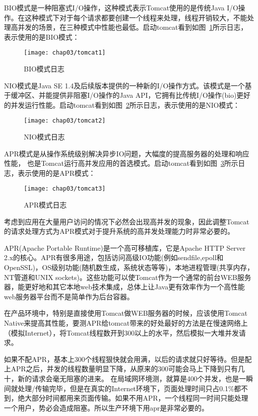 BIO模式是一种阻塞式I/O操作，这种模式表示Tomcat使用的是传统Java I/O操作。在这种模式下对于每个请求都要创建一个线程来处理，线程开销较大，不能处理高并发的场景，在三种模式中性能也最低。启动tomcat看到如图~\ref{fig:tomcat1}所示日志，表示使用的是BIO模式：
\begin{figure}[H] %
  \centering
  \texttt{[image: chap03/tomcat1]}
  \caption{BIO模式日志}
  \label{fig:tomcat1}
\end{figure}
NIO模式是Java SE 1.4及后续版本提供的一种新的I/O操作方式。该模式是一个基于缓冲区、并能提供非阻塞I/O操作的Java API，它拥有比传统I/O操作(bio)更好的并发运行性能。启动tomcat看到如图~\ref{fig:tomcat2}所示日志，表示使用的是NIO模式：
\begin{figure}[H] %
  \centering
  \texttt{[image: chap03/tomcat2]}
  \caption{NIO模式日志}
  \label{fig:tomcat2}
\end{figure}
APR模式是从操作系统级别解决异步IO问题，大幅度的提高服务器的处理和响应性能， 也是Tomcat运行高并发应用的首选模式。启动tomcat看到如图~\ref{fig:tomcat3}所示日志，表示使用的是APR模式：
\begin{figure}[H] %
  \centering
  \texttt{[image: chap03/tomcat3]}
  \caption{APR模式日志}
  \label{fig:tomcat3}
\end{figure}
考虑到应用在大量用户访问的情况下必然会出现高并发的现象，因此调整Tomcat的请求处理方式为APR模式对于提升系统的高并发处理能力时非常必要的\cite{蒋文旭2012大型高并发}。

APR(Apache Portable Runtime)是一个高可移植库，它是Apache HTTP Server 2.x的核心。APR有很多用途，包括访问高级IO功能(例如sendfile,epoll和OpenSSL)，OS级别功能(随机数生成，系统状态等等)，本地进程管理(共享内存，NT管道和UNIX sockets)。这些功能可以使Tomcat作为一个通常的前台WEB服务器，能更好地和其它本地web技术集成，总体上让Java更有效率作为一个高性能web服务器平台而不是简单作为后台容器\cite{vukotic2011embedding}。

在产品环境中，特别是直接使用Tomcat做WEB服务器的时候，应该使用Tomcat Native来提高其性能，要测APR给tomcat带来的好处最好的方法是在慢速网络上（模拟Internet），将Tomcat线程数开到300以上的水平，然后模拟一大堆并发请求。

如果不配APR，基本上300个线程狠快就会用满，以后的请求就只好等待。但是配上APR之后，并发的线程数量明显下降，从原来的300可能会马上下降到只有几十，新的请求会毫无阻塞的进来。
在局域网环境测，就算是400个并发，也是一瞬间就处理/传输完毕，但是在真实的Internet环境下，页面处理时间只占0.1\%都不到，绝大部分时间都用来页面传输。如果不用APR，一个线程同一时间只能处理一个用户，势必会造成阻塞。所以生产环境下用apr是非常必要的。
